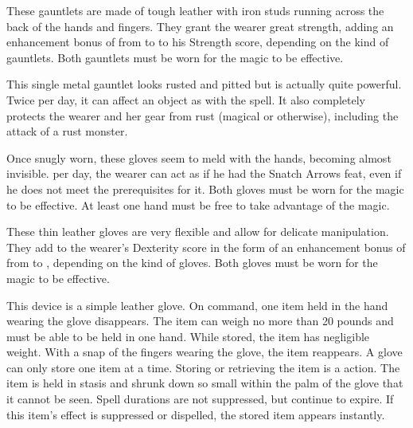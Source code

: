  These gauntlets are made of tough leather with iron studs running across the back of the hands and fingers. They grant the wearer great strength, adding an enhancement bonus of from  to  to his Strength score, depending on the kind of gauntlets. Both gauntlets must be worn for the magic to be effective.

 This single metal gauntlet looks rusted and pitted but is actually quite powerful. Twice per day, it can affect an object as with the  spell. It also completely protects the wearer and her gear from rust (magical or otherwise), including the attack of a rust monster.

 Once snugly worn, these gloves seem to meld with the hands, becoming almost invisible.  per day, the wearer can act as if he had the Snatch Arrows feat, even if he does not meet the prerequisites for it. Both gloves must be worn for the magic to be effective. At least one hand must be free to take advantage of the magic.

 These thin leather gloves are very flexible and allow for delicate manipulation. They add to the wearer's Dexterity score in the form of an enhancement bonus of from  to , depending on the kind of gloves. Both gloves must be worn for the magic to be effective.

 This device is a simple leather glove. On command, one item held in the hand wearing the glove disappears. The item can weigh no more than 20 pounds and must be able to be held in one hand. While stored, the item has negligible weight. With a snap of the fingers wearing the glove, the item reappears. A glove can only store one item at a time. Storing or retrieving the item is a  action. The item is held in stasis and shrunk down so small within the palm of the glove that it cannot be seen. Spell durations are not suppressed, but continue to expire. If this item's effect is suppressed or dispelled, the stored item appears instantly.

